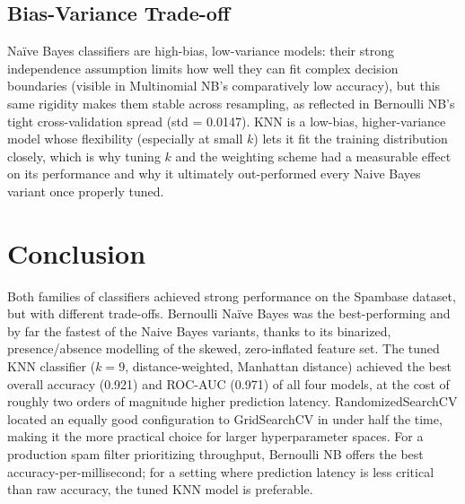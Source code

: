 \documentclass[12pt,a4paper]{article}
\begin{document}
\subsection*{Bias-Variance Trade-off}
Na\"ive Bayes classifiers are high-bias, low-variance models: their strong independence
assumption limits how well they can fit complex decision boundaries (visible in
Multinomial NB's comparatively low accuracy), but this same rigidity makes them stable
across resampling, as reflected in Bernoulli NB's tight cross-validation spread (std =
0.0147). KNN is a low-bias, higher-variance model whose flexibility (especially at small
$k$) lets it fit the training distribution closely, which is why tuning $k$ and the
weighting scheme had a measurable effect on its performance and why it ultimately
out-performed every Naive Bayes variant once properly tuned.

\section{Conclusion}
Both families of classifiers achieved strong performance on the Spambase dataset, but
with different trade-offs. Bernoulli Na\"ive Bayes was the best-performing and by far the
fastest of the Naive Bayes variants, thanks to its binarized, presence/absence modelling
of the skewed, zero-inflated feature set. The tuned KNN classifier ($k=9$,
distance-weighted, Manhattan distance) achieved the best overall accuracy (0.921) and
ROC-AUC (0.971) of all four models, at the cost of roughly two orders of magnitude
higher prediction latency. RandomizedSearchCV located an equally good configuration to
GridSearchCV in under half the time, making it the more practical choice for larger
hyperparameter spaces. For a production spam filter prioritizing throughput, Bernoulli
NB offers the best accuracy-per-millisecond; for a setting where prediction latency is
less critical than raw accuracy, the tuned KNN model is preferable.
\end{document}
